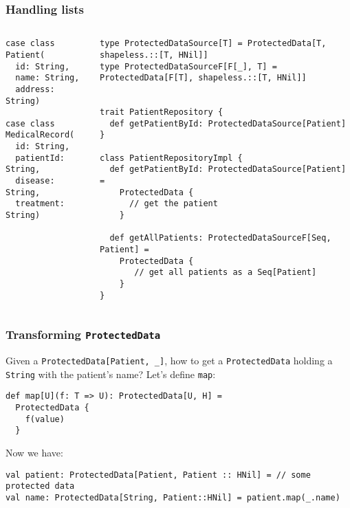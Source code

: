 \documentclass[aspectratio=169]{beamer}
\begin{document}
\begin{frame}[fragile]
\frametitle{Handling lists}
\begin{columns}
\begin{column}{0.3\textwidth}

\begin{lstlisting}[style=myScalastyle,frame=none]
case class Patient(
  id: String,
  name: String,
  address: String)
  
case class MedicalRecord(
  id: String,
  patientId: String,
  disease: String,
  treatment: String)
\end{lstlisting}


\end{column}
\pause
\vrule
\begin{column}{0.7\textwidth}  

\begin{lstlisting}[style=myScalastyle,frame=none]
type ProtectedDataSource[T] = ProtectedData[T, shapeless.::[T, HNil]] 
type ProtectedDataSourceF[F[_], T] = ProtectedData[F[T], shapeless.::[T, HNil]]
 

trait PatientRepository {
  def getPatientById: ProtectedDataSource[Patient]
}

class PatientRepositoryImpl {
  def getPatientById: ProtectedDataSource[Patient] =
    ProtectedData {
      // get the patient
    }
    
  def getAllPatients: ProtectedDataSourceF[Seq, Patient] =
    ProtectedData {
       // get all patients as a Seq[Patient]
    }
}

\end{lstlisting}


\end{column}
\end{columns}

\end{frame}

\begin{frame}[fragile]
\frametitle{Transforming \texttt{ProtectedData}}

Given a \texttt{ProtectedData[Patient, \_]}, how to get a \texttt{ProtectedData} holding a \texttt{String} with the patient's name?
\pause
Let's define \texttt{map}:
\begin{lstlisting}[style=myScalastyle,frame=none]
def map[U](f: T => U): ProtectedData[U, H] =
  ProtectedData {
    f(value)
  }
\end{lstlisting}
\pause
Now we have:
\begin{lstlisting}[style=myScalastyle,frame=none]
val patient: ProtectedData[Patient, Patient :: HNil] = // some protected data
val name: ProtectedData[String, Patient::HNil] = patient.map(_.name)
\end{lstlisting}

\end{frame}
\end{document}
